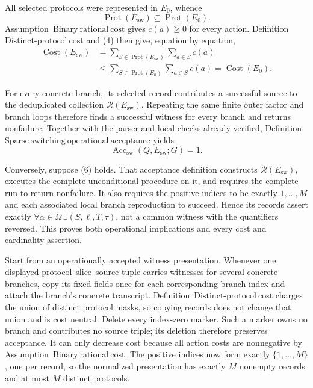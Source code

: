 All selected protocols were represented in \(E_0\), whence
\[
 \operatorname{Prot}(E_{\mathrm{sw}})
 \subseteq \operatorname{Prot}(E_0).
 \tag{4}
\]
Assumption~\(\mathrm{Binary\ rational\ cost}\) gives \(c(a)\geq0\) for every action.  Definition~\(\mathrm{Distinct\mbox{-}protocol\ cost}\) and (4) then give, equation by equation,
\[
\begin{aligned}
 \operatorname{Cost}(E_{\mathrm{sw}})
 &=\sum_{S\in\operatorname{Prot}(E_{\mathrm{sw}})}\sum_{a\in S}c(a)\\
 &\leq \sum_{S\in\operatorname{Prot}(E_0)}\sum_{a\in S}c(a)
 =\operatorname{Cost}(E_0).
\end{aligned}
\tag{5}
\]

For every concrete branch, its selected record contributes a successful source to the deduplicated collection \(\mathcal R(E_{\mathrm{sw}})\).  Repeating the same finite outer factor and branch loops therefore finds a successful witness for every branch and returns nonfailure.  Together with the parser and local checks already verified, Definition~\(\mathrm{Sparse\ switching\ operational\ acceptance}\) yields
\[
 \operatorname{Acc}_{\mathrm{sw}}(Q,E_{\mathrm{sw}};G)=1.
 \tag{6}
\]

Conversely, suppose (6) holds.  That acceptance definition constructs \(\mathcal R(E_{\mathrm{sw}})\), executes the complete unconditional procedure on it, and requires the complete run to return nonfailure.  It also requires the positive indices to be exactly \(1,\ldots,M\) and each associated local branch reproduction to succeed.  Hence its records assert exactly
\(\forall\alpha\in\Omega\,\exists(S,\ell,T,\tau)\), not a common witness with the quantifiers reversed.  This proves both operational implications and every cost and cardinality assertion.

Start from an operationally accepted witness presentation.  Whenever one displayed protocol--slice--source tuple carries witnesses for several concrete branches, copy its fixed fields once for each corresponding branch index and attach the branch's concrete transcript.  Definition~\(\mathrm{Distinct\mbox{-}protocol\ cost}\) charges the union of distinct protocol masks, so copying records does not change that union and is cost neutral.  Delete every index-zero marker.  Such a marker owns no branch and contributes no source triple; its deletion therefore preserves acceptance.  It can only decrease cost because all action costs are nonnegative by Assumption~\(\mathrm{Binary\ rational\ cost}\).  The positive indices now form exactly \(\{1,\ldots,M\}\), one per record, so the normalized presentation has exactly \(M\) nonempty records and at most \(M\) distinct protocols.

